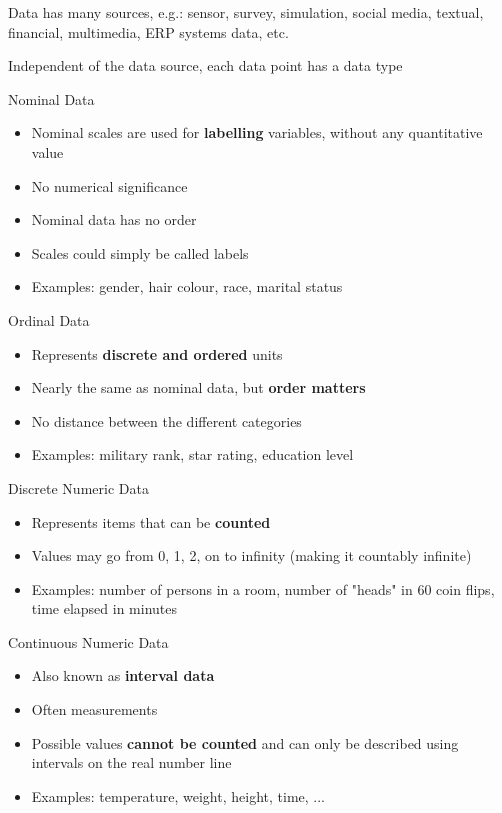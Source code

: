 \begin{definition}{Data} has many sources, e.g.: 
    sensor, survey, simulation, social media, textual, financial, multimedia, ERP systems data, etc.
    
    Independent of the data source, each data point has a data type
\end{definition}

\begin{corollary}{Nominal Data}
    \begin{itemize}
        \item Nominal scales are used for \textbf{labelling} variables, without any quantitative value
        \item No numerical significance
        \item Nominal data has no order
        \item Scales could simply be called labels
        \item Examples: gender, hair colour, race, marital status
    \end{itemize}
\end{corollary}

\begin{corollary}{Ordinal Data}
    \begin{itemize}
        \item Represents \textbf{discrete and ordered} units
        \item Nearly the same as nominal data, but \textbf{order matters}
        \item No distance between the different categories
        \item Examples: military rank, star rating, education level
    \end{itemize}
\end{corollary}

\begin{corollary}{Discrete Numeric Data}
    \begin{itemize}
        \item Represents items that can be \textbf{counted}
        \item Values may go from 0, 1, 2, on to infinity (making it countably infinite)
        \item Examples: number of persons in a room, number of "heads" in 60 coin flips, time elapsed in minutes
    \end{itemize}
\end{corollary}

\begin{corollary}{Continuous Numeric Data}
    \begin{itemize}
        \item Also known as \textbf{interval data}
        \item Often measurements
        \item Possible values \textbf{cannot be counted} and can only be described using intervals on the real number line
        \item Examples: temperature, weight, height, time, ...
    \end{itemize}
\end{corollary}



